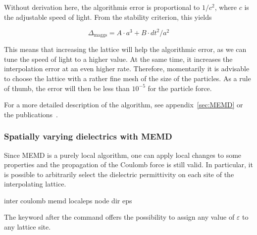 Without derivation here, the algorithmis error is proportional to
$1/c^2$, where $c$ is the adjustable speed of light. From the
stability criterion, this yields

\begin{equation}
\Delta_\text{maggs} = A\cdot a^3 + B\cdot dt^2/a^2
\end{equation}

This means that increasing the lattice will help the algorithmic
error, as we can tune the speed of light to a higher value. At the
same time, it increases the interpolation error at an even higher
rate. Therefore, momentarily it is advisable to choose the lattice
with a rather fine mesh of the size of the particles. As a rule of
thumb, the error will then be less than $10^{-5}$ for the particle
force.

For a more detailed description of the algorithm, see
appendix~\vref{sec:MEMD} or the publications~\cite{maggs02a,
  pasichnyk04a}.

\subsubsection{Spatially varying dielectrics with MEMD}
\label{sec:dielectric-memd}

Since MEMD is a purely local algorithm, one can apply local changes
to some properties and the propagation of the Coulomb force is still
valid. In particular, it is possible to arbitrarily select the
dielectric permittivity on each site of the interpolating lattice.

\begin{essyntax}
  inter coulomb 
  memd localeps node   
  dir  eps \var{\varepsilon}
  \begin{features}
  \end{features}
\end{essyntax}

The keyword  after the 
command offers the possibility to assign any value of $\varepsilon$
to any lattice site.


